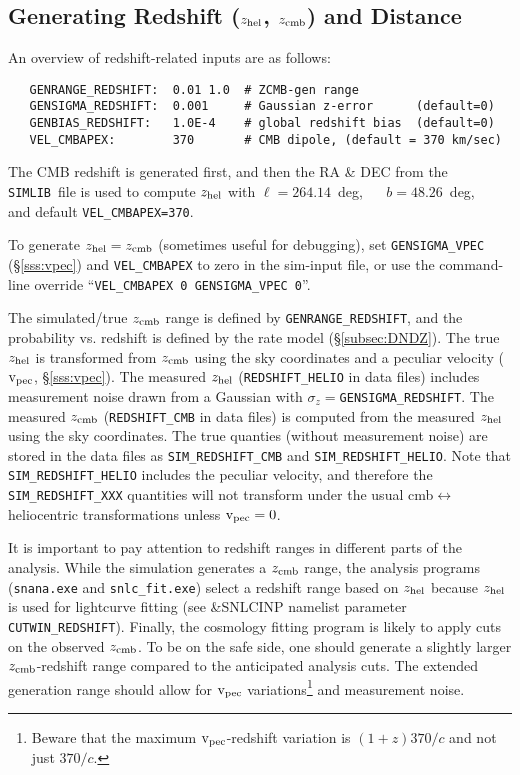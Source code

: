 \documentclass[12pt]{article}
\newcommand{\simlib}{{\tt SIMLIB}}
\newcommand{\zhelio}{z_{\rm hel}}
\newcommand{\zcmb}{z_{\rm cmb}}
\newcommand{\vpec}{{\rm v}_{\rm pec}}
\begin{document}
\clearpage
\subsection{Generating Redshift ($\zhelio$, $\zcmb$) and Distance }
\label{subsec:genz}

An overview of redshift-related inputs are as follows:
\begin{verbatim}
   GENRANGE_REDSHIFT:  0.01 1.0  # ZCMB-gen range
   GENSIGMA_REDSHIFT:  0.001     # Gaussian z-error      (default=0)
   GENBIAS_REDSHIFT:   1.0E-4    # global redshift bias  (default=0)
   VEL_CMBAPEX:        370       # CMB dipole, (default = 370 km/sec)
\end{verbatim}
%
The CMB redshift is generated first, and then the RA \& DEC
from the \simlib\ file is used to compute $\zhelio$ with
$\ell=264.14$~deg, ~~ $b=48.26$~deg,~~
and default {\tt VEL\_CMBAPEX=370}.

To generate $\zhelio=\zcmb$ (sometimes useful for debugging), 
set {\tt GENSIGMA\_VPEC} (\S\ref{sss:vpec}) and  {\tt VEL\_CMBAPEX} 
to zero in the sim-input file, or use the command-line override 
``{\tt VEL\_CMBAPEX 0  GENSIGMA\_VPEC 0}''.


The simulated/true $\zcmb$ range is defined by {\tt GENRANGE\_REDSHIFT},
and the probability vs. redshift is defined by the rate model
(\S\ref{subsec:DNDZ}).
The true $\zhelio$ is transformed from $\zcmb$ using the sky coordinates 
and a peculiar velocity ($\vpec$, \S\ref{sss:vpec}).
The measured $\zhelio$ ({\tt REDSHIFT\_HELIO} in data files) 
includes measurement noise drawn from a 
Gaussian with $\sigma_z=${\tt GENSIGMA\_REDSHIFT}.
The measured $\zcmb$ ({\tt REDSHIFT\_CMB} in data files) 
is computed from the measured $\zhelio$
using the sky coordinates.
The true quanties (without measurement noise)
are stored in the data files as
{\tt SIM\_REDSHIFT\_CMB} and {\tt SIM\_REDSHIFT\_HELIO}.
Note that {\tt SIM\_REDSHIFT\_HELIO} includes the
peculiar velocity, and therefore the {\tt SIM\_REDSHIFT\_XXX}
quantities will not transform under the usual 
cmb$\leftrightarrow$heliocentric transformations
unless $\vpec=0$.

It is important to pay attention to redshift ranges in 
different parts of the analysis. While the simulation
generates a $\zcmb$ range, the analysis programs
({\tt snana.exe} and {\tt snlc\_fit.exe}) 
select a redshift range based on $\zhelio$ because $\zhelio$
is used for lightcurve fitting
(see \&SNLCINP namelist parameter {\tt CUTWIN\_REDSHIFT}).
Finally, the cosmology fitting program is likely to
apply cuts on the observed $\zcmb$.
To be on the safe side, one should generate a slightly larger
$\zcmb$-redshift range compared to the anticipated 
analysis cuts. The extended generation range should allow
for $\vpec$ variations\footnote{Beware that the maximum 
$\vpec$-redshift variation is $(1+z) 370/c$ and 
not just $370/c$.}  %
and measurement noise. 
\end{document}
